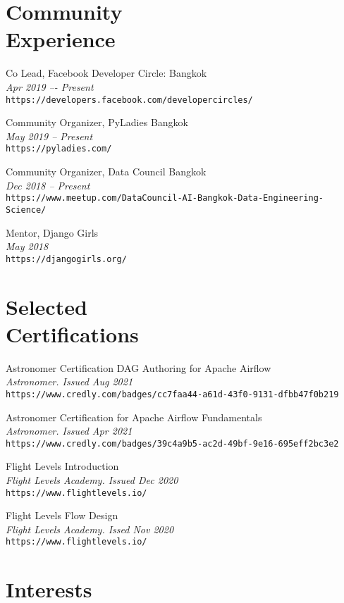 \documentclass[margin, 10pt]{res}
\begin{document}
\begin{resume}
\section{Community \\ Experience}

Co Lead, Facebook Developer Circle: Bangkok\\
{\it \small Apr 2019 –- Present}\\
{\tt https://developers.facebook.com/developercircles/}

Community Organizer, PyLadies Bangkok\\
{\it \small May 2019 -- Present}\\
{\tt https://pyladies.com/}

Community Organizer, Data Council Bangkok\\
{\it \small Dec 2018 -- Present}\\
{\tt https://www.meetup.com/DataCouncil-AI-Bangkok-Data-Engineering-Science/}

Mentor, Django Girls\\
{\it \small May 2018}\\
{\tt https://djangogirls.org/}

\section{Selected \\ Certifications}

Astronomer Certification DAG Authoring for Apache Airflow\\
{\it \small Astronomer. Issued Aug 2021}\\
{\tt https://www.credly.com/badges/cc7faa44-a61d-43f0-9131-dfbb47f0b219}

Astronomer Certification for Apache Airflow Fundamentals\\
{\it \small Astronomer. Issued Apr 2021}\\
{\tt https://www.credly.com/badges/39c4a9b5-ac2d-49bf-9e16-695eff2bc3e2}

Flight Levels Introduction\\
{\it \small Flight Levels Academy. Issued Dec 2020}\\
{\tt https://www.flightlevels.io/}

Flight Levels Flow Design\\
{\it \small Flight Levels Academy. Issed Nov 2020}\\
{\tt https://www.flightlevels.io/}

\section{Interests}


\end{resume}
\end{document}
